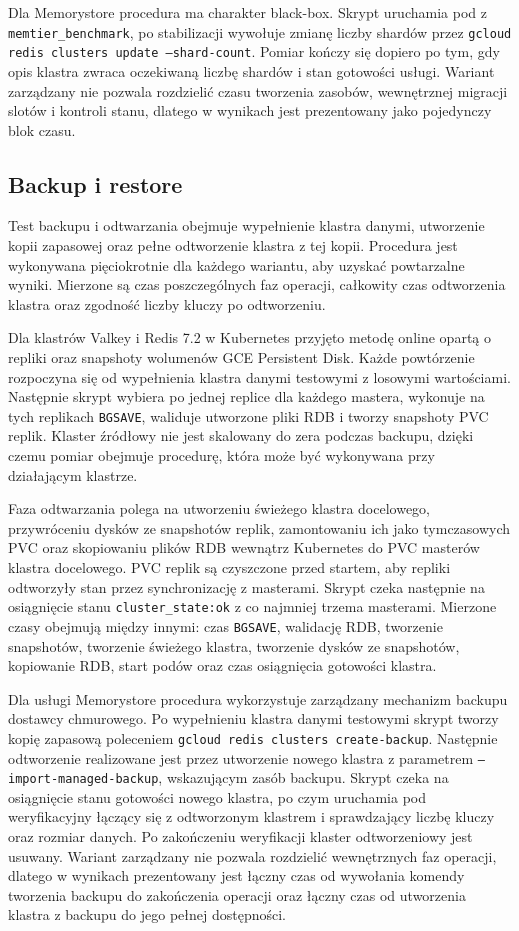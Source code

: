 Dla Memorystore procedura ma charakter black-box. Skrypt uruchamia pod z \texttt{memtier\_benchmark}, po stabilizacji wywołuje zmianę liczby shardów przez \texttt{gcloud redis clusters update --shard-count}. Pomiar kończy się dopiero po tym, gdy opis klastra zwraca oczekiwaną liczbę shardów i stan gotowości usługi. Wariant zarządzany nie pozwala rozdzielić czasu tworzenia zasobów, wewnętrznej migracji slotów i kontroli stanu, dlatego w wynikach jest prezentowany jako pojedynczy blok czasu.

\subsection{Backup i restore}\label{subsec:backup_restore}

Test backupu i odtwarzania obejmuje wypełnienie klastra danymi, utworzenie kopii zapasowej oraz pełne odtworzenie klastra z tej kopii. Procedura jest wykonywana pięciokrotnie dla każdego wariantu, aby uzyskać powtarzalne wyniki. Mierzone są czas poszczególnych faz operacji, całkowity czas odtworzenia klastra oraz zgodność liczby kluczy po odtworzeniu.

Dla klastrów Valkey i Redis 7.2 w Kubernetes przyjęto metodę online opartą o repliki oraz snapshoty wolumenów GCE Persistent Disk. Każde powtórzenie rozpoczyna się od wypełnienia klastra danymi testowymi z losowymi wartościami. Następnie skrypt wybiera po jednej replice dla każdego mastera, wykonuje na tych replikach \texttt{BGSAVE}, waliduje utworzone pliki RDB i tworzy snapshoty PVC replik. Klaster źródłowy nie jest skalowany do zera podczas backupu, dzięki czemu pomiar obejmuje procedurę, która może być wykonywana przy działającym klastrze.

Faza odtwarzania polega na utworzeniu świeżego klastra docelowego, przywróceniu dysków ze snapshotów replik, zamontowaniu ich jako tymczasowych PVC oraz skopiowaniu plików RDB wewnątrz Kubernetes do PVC masterów klastra docelowego. PVC replik są czyszczone przed startem, aby repliki odtworzyły stan przez synchronizację z masterami. Skrypt czeka następnie na osiągnięcie stanu \texttt{cluster\_state:ok} z co najmniej trzema masterami. Mierzone czasy obejmują między innymi: czas \texttt{BGSAVE}, walidację RDB, tworzenie snapshotów, tworzenie świeżego klastra, tworzenie dysków ze snapshotów, kopiowanie RDB, start podów oraz czas osiągnięcia gotowości klastra.

Dla usługi Memorystore procedura wykorzystuje zarządzany mechanizm backupu dostawcy chmurowego. Po wypełnieniu klastra danymi testowymi skrypt tworzy kopię zapasową poleceniem \texttt{gcloud redis clusters create-backup}. Następnie odtworzenie realizowane jest przez utworzenie nowego klastra z parametrem \texttt{--import-managed-backup}, wskazującym zasób backupu. Skrypt czeka na osiągnięcie stanu gotowości nowego klastra, po czym uruchamia pod weryfikacyjny łączący się z odtworzonym klastrem i sprawdzający liczbę kluczy oraz rozmiar danych. Po zakończeniu weryfikacji klaster odtworzeniowy jest usuwany. Wariant zarządzany nie pozwala rozdzielić wewnętrznych faz operacji, dlatego w wynikach prezentowany jest łączny czas od wywołania komendy tworzenia backupu do zakończenia operacji oraz łączny czas od utworzenia klastra z backupu do jego pełnej dostępności.

